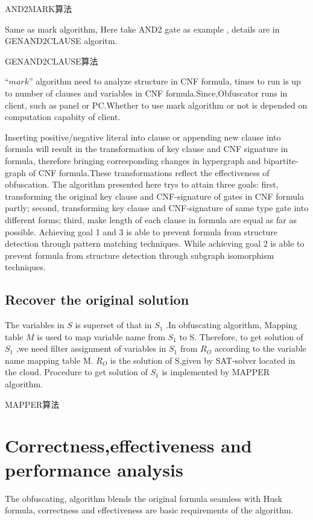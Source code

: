 \documentclass[runningheads,a4paper]{llncs}
\begin{document}
\noindent AND2MARK算法

Same as mark algorithm, Here take AND2 gate as example , details are in GENAND2CLAUSE algoritm.

\noindent GENAND2CLAUSE算法

$“mark”$ algorithm need to analyze structure in CNF formula, times to run is up to number of clauses and variables in CNF formula.Since,Obfuscator runs in client, such as panel or PC.Whether to use mark algorithm or not is depended on computation capabity of client.

Inserting positive/negative literal into clause or appending new clause into formula will result in the transformation of key clause and CNF signature in formula, therefore bringing corresponding changes in hypergraph and bipartite-graph of CNF formula.These transformations reflect the effectiveness of obfuscation. The algorithm presented here trys to attain three goals: first, transforming the original key clause and CNF-signature of gates in CNF formula partly; second, transforming key clause and CNF-signature of same type gate into different forms; third, make length of each clause in formula are equal as far as possible. Achieving goal 1 and 3 is able to prevent formula from structure detection through pattern matching techniques. While achieving goal 2 is able to prevent formula from structure detection through subgraph isomorphism techniques. 
\subsection{Recover the original solution}

The variables in $S$ is superset of that in $S_1$ .In obfuscating algorithm, Mapping table $M$ is used to map variable name from $S_1$  to S. Therefore, to get solution of $S_1$  ,we need filter assignment of variables in $S_1$  from  $R_O$  according to the variable name mapping table M.  $R_O$  is the solution of S,given by SAT-solver located in the cloud. Procedure to get solution of $S_1$  is implemented by MAPPER algorithm.

\noindent MAPPER算法
\section{Correctness,effectiveness and performance analysis}

The obfuscating, algorithm blends the original formula seamless with Husk formula, correctness and effectiveness are basic requirements of the algorithm. 
\end{document}
